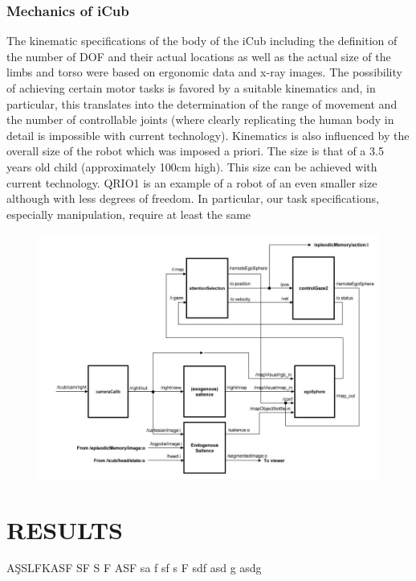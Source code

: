 \documentclass[a4paper, 11pt]{report}
\begin{document}
\subsection{Mechanics of iCub}
\cite{David Vernon, The iCub}The kinematic specifications of the body of the 
iCub 
including the definition 
of the number of DOF and their actual locations as well as the actual size of 
the limbs and torso were based on ergonomic data and x-ray images.
The possibility of achieving certain motor tasks is favored by a suitable 
kinematics and, in particular, this translates into the determination of the 
range of movement and the number of controllable joints (where clearly 
replicating the human body in detail is impossible with current technology). 
Kinematics is also influenced by the overall size of the robot which was 
imposed a priori. The size is that of a 3.5 years old child (approximately 
100cm high). This size can be achieved with current technology. QRIO1 is an 
example of a robot of an even smaller size although with less degrees of 
freedom. In particular, our task specifications, especially manipulation, 
require at least the same  
  \begin{figure}[h!]
    \centering
    \includegraphics[width=0.9\linewidth]{cognitive_architecture_A}
    \caption{}
    \label{fig:cognitive_architecture_A}
  \end{figure} 

{\tiny}\chapter{RESULTS}

AŞSLFKASF
SF
S
F
ASF
sa
f
sf
s
F
sdf
asd
g
asdg
\end{document}
